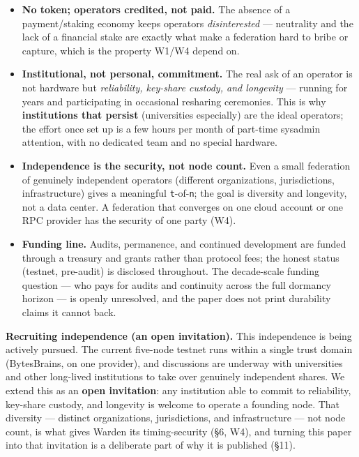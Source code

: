 \documentclass[
  11pt,
]{article}
\providecommand{\tightlist}{%
  \setlength{\itemsep}{0pt}\setlength{\parskip}{0pt}}
\begin{document}
\begin{itemize}
\tightlist
\item
  \textbf{No token; operators credited, not paid.} The absence of a
  payment/staking economy keeps operators \emph{disinterested} ---
  neutrality and the lack of a financial stake are exactly what make a
  federation hard to bribe or capture, which is the property W1/W4
  depend on.
\item
  \textbf{Institutional, not personal, commitment.} The real ask of an
  operator is not hardware but \emph{reliability, key-share custody, and
  longevity} --- running for years and participating in occasional
  resharing ceremonies. This is why \textbf{institutions that persist}
  (universities especially) are the ideal operators; the effort once set
  up is a few hours per month of part-time sysadmin attention, with no
  dedicated team and no special hardware.
\item
  \textbf{Independence is the security, not node count.} Even a small
  federation of genuinely independent operators (different
  organizations, jurisdictions, infrastructure) gives a meaningful
  \texttt{t}-of-\texttt{n}; the goal is diversity and longevity, not a
  data center. A federation that converges on one cloud account or one
  RPC provider has the security of one party (W4).
\item
  \textbf{Funding line.} Audits, permanence, and continued development
  are funded through a treasury and grants rather than protocol fees;
  the honest status (testnet, pre-audit) is disclosed throughout. The
  decade-scale funding question --- who pays for audits and continuity
  across the full dormancy horizon --- is openly unresolved, and the
  paper does not print durability claims it cannot back.
\end{itemize}

\textbf{Recruiting independence (an open invitation).} This independence
is being actively pursued. The current five-node testnet runs within a
single trust domain (BytesBrains, on one provider), and discussions are
underway with universities and other long-lived institutions to take
over genuinely independent shares. We extend this as an \textbf{open
invitation}: any institution able to commit to reliability, key-share
custody, and longevity is welcome to operate a founding node. That
diversity --- distinct organizations, jurisdictions, and infrastructure
--- not node count, is what gives Warden its timing-security (§6, W4),
and turning this paper into that invitation is a deliberate part of why
it is published (§11).
\end{document}
